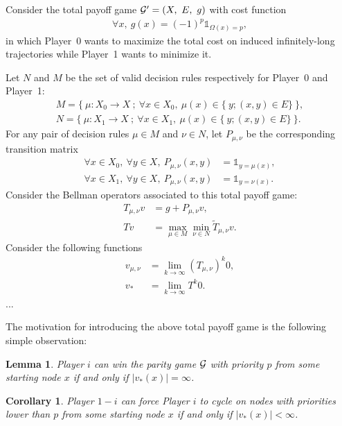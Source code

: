 \documentclass{article}
\newtheorem{lemma}{Lemma}
\newtheorem{corollary}{Corollary}
\def\1{{\mathds 1}}
\def\G{{\cal G}}
\def\pa{Player~0}
\def\pb{Player~1}
\begin{document}
Consider the total payoff game $\G'=(X,~ E,~ g)$ with cost function
\begin{align}
  \forall x,~ g(x) = (-1)^p \1_{\Omega(x)=p},
\end{align}
in which \pa{ }wants to maximize the total cost on induced infinitely-long trajectories while \pb{ }wants to minimize it.

Let $N$ and $M$ be the set of valid decision rules respectively for \pa{ }and \pb:
\begin{align}
  M = \{~ \mu:X_0 \to X ~;~ \forall x \in X_0,~ \mu(x) \in \{~ y;(x,y) \in E\} ~\},\\
  N = \{~ \mu:X_1 \to X ~;~ \forall x \in X_1,~ \mu(x) \in \{~ y;(x,y) \in E\} ~\}.
\end{align}
For any pair of decision rules $\mu \in M$ and $\nu \in N$, let $P_{\mu,\nu}$ be the corresponding transition matrix
\begin{align}
  \forall x \in X_0,~ \forall y \in X,~ P_{\mu,\nu}(x,y) &= \1_{y=\mu(x)}, \\
  \forall x \in X_1,~ \forall y \in X,~ P_{\mu,\nu}(x,y) &= \1_{y=\nu(x)}.
\end{align}
Consider the Bellman operators associated to this total payoff game:
\begin{align}
  T_{\mu,\nu}v &= g + P_{\mu,\nu}v,\\
  T v & = \max_{\mu \in M} \min_{\nu \in N}\tilde T_{\mu,\nu}v.
\end{align}
Consider the following functions
\begin{align}
  v_{\mu,\nu} &= \lim_{k \to \infty}(T_{\mu,\nu})^k0, \\
  v_* &= \lim_{k \to \infty}T^k0.
\end{align}
...

The motivation for introducing the above total payoff game is the following simple observation:
\begin{lemma}
  Player $i$ can win the parity game $\G$ with priority $p$ from some starting node $x$ if and only if $|v_*(x)|=\infty$.
\end{lemma}
\begin{corollary}
  Player $1-i$ can force Player $i$ to cycle on nodes with priorities lower than $p$ from some starting node $x$ if and only if $|v_*(x)|<\infty$.
\end{corollary}
\end{document}
